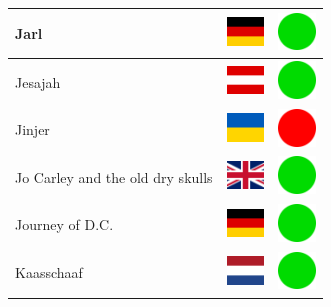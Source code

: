 \documentclass[12pt, a4paper, twoside]{report}
\begin{document}
\begin{center}
\begin{longtable}{|p{5cm}|p{2cm}|p{2cm}|}
 Jarl                                                       & \includegraphics[width=1cm]{4x3/de} &   \includegraphics[width=1cm]{likes/y} \\ \hline
 Jesajah                                                    & \includegraphics[width=1cm]{4x3/at} &   \includegraphics[width=1cm]{likes/y} \\ \hline
 Jinjer                                                     & \includegraphics[width=1cm]{4x3/ua} &   \includegraphics[width=1cm]{likes/n} \\ \hline
 Jo Carley and the old dry skulls                           & \includegraphics[width=1cm]{4x3/gb} &   \includegraphics[width=1cm]{likes/y} \\ \hline
 Journey of D.C.                                            & \includegraphics[width=1cm]{4x3/de} &   \includegraphics[width=1cm]{likes/y} \\ \hline
 Kaasschaaf                                                 & \includegraphics[width=1cm]{4x3/nl} &   \includegraphics[width=1cm]{likes/y} \\ \hline

\end{longtable}
\end{center}
\end{document}
